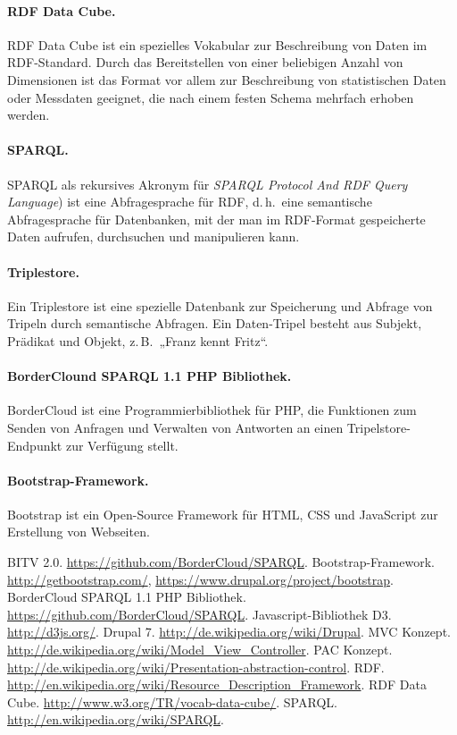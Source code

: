 \documentclass[a4paper,11pt,twoside]{article}
\begin{document}
\paragraph{RDF Data Cube.} 
RDF Data Cube \cite{RDFCube} ist ein spezielles Vokabular zur Beschreibung von
Daten im RDF-Standard. Durch das Bereitstellen von einer beliebigen Anzahl von
Dimensionen ist das Format vor allem zur Beschreibung von statistischen Daten
oder Messdaten geeignet, die nach einem festen Schema mehrfach erhoben werden.

\paragraph{SPARQL.} 
SPARQL als rekursives Akronym für \textit{SPARQL Protocol And RDF Query
  Language}) \cite{SPARQL} ist eine Abfragesprache für RDF, d.\,h.\ eine
semantische Abfragesprache für Datenbanken, mit der man im RDF-Format
gespeicherte Daten aufrufen, durchsuchen und manipulieren kann.

\paragraph{Triplestore.}	
Ein Triplestore ist eine spezielle Datenbank zur Speicherung und Abfrage von
Tripeln durch semantische Abfragen. Ein Daten-Tripel besteht aus Subjekt,
Prädikat und Objekt, z.\,B.\ „Franz kennt Fritz“.

\paragraph{BorderClound SPARQL 1.1 PHP Bibliothek.} 
BorderCloud \cite{BorderCloud} ist eine Programmierbibliothek für PHP, die
Funktionen zum Senden von Anfragen und Verwalten von Antworten an einen
Tripelstore-Endpunkt zur Verfügung stellt.

\paragraph{Bootstrap-Framework.} 
Bootstrap \cite{Bootstrap} ist ein Open-Source Framework für HTML, CSS und
JavaScript zur Erstellung von Webseiten.


\begin{thebibliography}{xxx}\raggedright
{} BITV 2.0.  \url{https://github.com/BorderCloud/SPARQL}.
 Bootstrap-Framework.  \url{http://getbootstrap.com/},
  \url{https://www.drupal.org/project/bootstrap}. 
 BorderCloud SPARQL 1.1 PHP Bibliothek.
  \url{https://github.com/BorderCloud/SPARQL}.
 Javascript-Bibliothek D3. \url{http://d3js.org/}.
 Drupal 7. \url{http://de.wikipedia.org/wiki/Drupal}.
 MVC Konzept.
  \url{http://de.wikipedia.org/wiki/Model_View_Controller}.
 PAC Konzept.
  \url{http://de.wikipedia.org/wiki/Presentation-abstraction-control}.
 RDF.
  \url{http://en.wikipedia.org/wiki/Resource_Description_Framework}.
 RDF Data Cube.  \url{http://www.w3.org/TR/vocab-data-cube/}.
 SPARQL. \url{http://en.wikipedia.org/wiki/SPARQL}.

\end{thebibliography}
\end{document}
